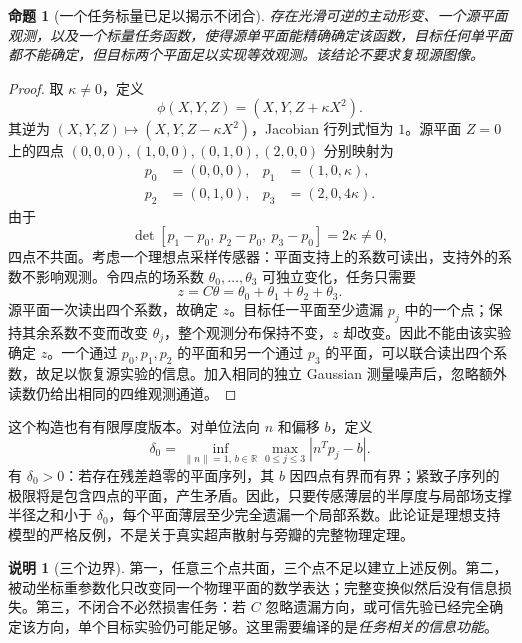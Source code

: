 \documentclass[11pt,a4paper]{article}
\numberwithin{equation}{section}
\newtheorem{proposition}[theorem]{命题}
\theoremstyle{definition}
\newtheorem{remark}[theorem]{说明}
\newcommand{\R}{\mathbb R}
\newcommand{\norm}[1]{\left\lVert#1\right\rVert}
\newcommand{\abs}[1]{\left\lvert#1\right\rvert}
\begin{document}
\begin{proposition}[一个任务标量已足以揭示不闭合]
\label{cmp:four-points}
存在光滑可逆的主动形变、一个源平面观测，以及一个标量任务函数，使得源单平面能精确确定该函数，目标任何单平面都不能确定，但目标两个平面足以实现等效观测。该结论不要求复现源图像。
\end{proposition}
\begin{proof}
取 $\kappa\ne0$，定义
\begin{equation}
 \phi(X,Y,Z)=(X,Y,Z+\kappa X^2).
\end{equation}
其逆为 $(X,Y,Z)\mapsto(X,Y,Z-\kappa X^2)$，Jacobian 行列式恒为 $1$。源平面 $Z=0$ 上的四点 $(0,0,0),(1,0,0),(0,1,0),(2,0,0)$ 分别映射为
\begin{align}
 p_0&=(0,0,0),&p_1&=(1,0,\kappa),\\
 p_2&=(0,1,0),&p_3&=(2,0,4\kappa).
\end{align}
由于
\begin{equation}
 \det[p_1-p_0,\ p_2-p_0,\ p_3-p_0]=2\kappa\ne0,
\end{equation}
四点不共面。考虑一个理想点采样传感器：平面支持上的系数可读出，支持外的系数不影响观测。令四点的场系数 $\theta_0,\ldots,\theta_3$ 可独立变化，任务只需要
\begin{equation}
 z=C\theta=\theta_0+\theta_1+\theta_2+\theta_3.
\end{equation}
源平面一次读出四个系数，故确定 $z$。目标任一平面至少遗漏 $p_j$ 中的一个点；保持其余系数不变而改变 $\theta_j$，整个观测分布保持不变，$z$ 却改变。因此不能由该实验确定 $z$。一个通过 $p_0,p_1,p_2$ 的平面和另一个通过 $p_3$ 的平面，可以联合读出四个系数，故足以恢复源实验的信息。加入相同的独立 Gaussian 测量噪声后，忽略额外读数仍给出相同的四维观测通道。
\end{proof}

这个构造也有有限厚度版本。对单位法向 $n$ 和偏移 $b$，定义
\begin{equation}
 \delta_0=\inf_{\norm{n}=1,\,b\in\R}
             \max_{0\le j\le3}\abs{n^Tp_j-b}.
\end{equation}
有 $\delta_0>0$：若存在残差趋零的平面序列，其 $b$ 因四点有界而有界；紧致子序列的极限将是包含四点的平面，产生矛盾。因此，只要传感薄层的半厚度与局部场支撑半径之和小于 $\delta_0$，每个平面薄层至少完全遗漏一个局部系数。此论证是理想支持模型的严格反例，不是关于真实超声散射与旁瓣的完整物理定理。

\begin{remark}[三个边界]
\label{cmp:nonclosure-boundary}
第一，任意三个点共面，三个点不足以建立上述反例。第二，被动坐标重参数化只改变同一个物理平面的数学表达；完整变换似然后没有信息损失。第三，不闭合不必然损害任务：若 $C$ 忽略遗漏方向，或可信先验已经完全确定该方向，单个目标实验仍可能足够。这里需要编译的是\emph{任务相关的信息功能}。
\end{remark}
\end{document}
